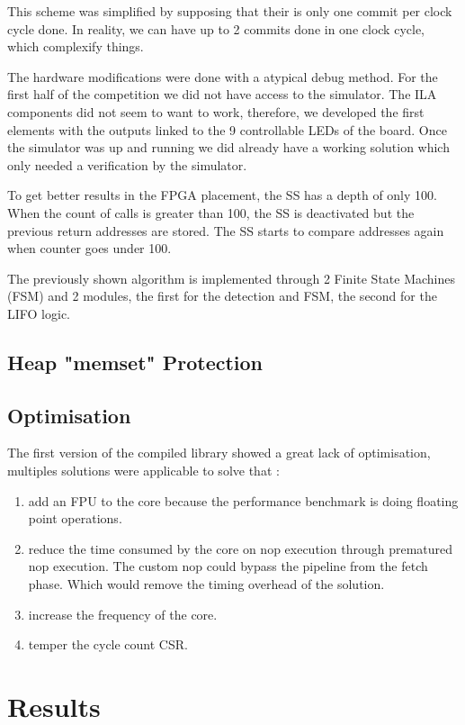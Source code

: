 \documentclass[9pt]{article}
\begin{document}
\begin{multicols}{2}

This scheme was simplified by supposing that their is only one commit per clock cycle done. In reality, we can have up to 2 commits done in one clock cycle, which complexify things. 

The hardware modifications were done with a atypical debug method. For the first half of the competition we did not have access to the simulator. The ILA components did not seem to want to work, therefore, we developed the first elements with the outputs linked to the 9 controllable LEDs of the board. Once the simulator was up and running we did already have a working solution which only needed a verification by the simulator.

To get better results in the FPGA placement, the SS has a depth of only 100. When the count of calls is greater than 100, the SS is deactivated but the previous return addresses are stored. 
The SS starts to compare addresses again when counter goes under 100. 

The previously shown algorithm is implemented through 2 Finite State Machines (FSM) and 2 modules, the first for the detection and FSM, the second for the LIFO logic.

\subsection{Heap "memset" Protection}

\subsection{Optimisation}
The first version of the compiled library showed a great lack of optimisation, multiples solutions were applicable to solve that : 
\begin{enumerate}
    \item add an FPU to the core because the performance benchmark is doing floating point operations.
    \item reduce the time consumed by the core on nop execution through prematured nop execution. The custom nop could bypass the pipeline from the fetch phase. Which would remove the timing overhead of the solution.
    \item increase the frequency of the core.
    \item temper the cycle count CSR.
\end{enumerate}

\section{Results}

\end{multicols}
\end{document}
